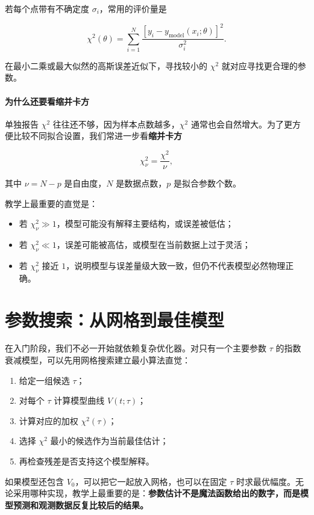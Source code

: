 若每个点带有不确定度 $\sigma_i$，常用的评价量是

\[
\chi^2(\theta) = \sum_{i=1}^{N}
\frac{\left[y_i - y_{\mathrm{model}}(x_i;\theta)\right]^2}{\sigma_i^2}.
\]

在最小二乘或最大似然的高斯误差近似下，寻找较小的 $\chi^2$ 就对应寻找更合理的参数。

\paragraph{为什么还要看缩并卡方}

单独报告 $\chi^2$ 往往还不够，因为样本点数越多，$\chi^2$ 通常也会自然增大。为了更方便比较不同拟合设置，我们常进一步看\textbf{缩并卡方}

\[
\chi^2_\nu = \frac{\chi^2}{\nu},
\]

其中 $\nu = N - p$ 是自由度，$N$ 是数据点数，$p$ 是拟合参数个数。

教学上最重要的直觉是：

\begin{itemize}
    \item 若 $\chi^2_\nu \gg 1$，模型可能没有解释主要结构，或误差被低估；
    \item 若 $\chi^2_\nu \ll 1$，误差可能被高估，或模型在当前数据上过于灵活；
    \item 若 $\chi^2_\nu$ 接近 $1$，说明模型与误差量级大致一致，但仍不代表模型必然物理正确。
\end{itemize}

\section{参数搜索：从网格到最佳模型}

在入门阶段，我们不必一开始就依赖复杂优化器。对只有一个主要参数 $\tau$ 的指数衰减模型，可以先用网格搜索建立最小算法直觉：

\begin{enumerate}
    \item 给定一组候选 $\tau$；
    \item 对每个 $\tau$ 计算模型曲线 $V(t;\tau)$；
    \item 计算对应的加权 $\chi^2(\tau)$；
    \item 选择 $\chi^2$ 最小的候选作为当前最佳估计；
    \item 再检查残差是否支持这个模型解释。
\end{enumerate}

如果模型还包含 $V_0$，可以把它一起放入网格，也可以在固定 $\tau$ 时求最优幅度。无论采用哪种实现，教学上最重要的是：\textbf{参数估计不是魔法函数给出的数字，而是模型预测和观测数据反复比较后的结果。}

